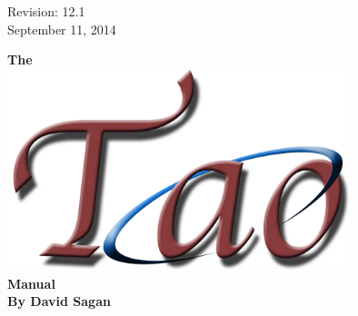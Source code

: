 \thispagestyle{empty}

\begin{flushright}
\large
Revision: 12.1 \\
September 11, 2014 \\
\end{flushright}

\vfill


{
\begin{center}
{\Huge \sf\bf The} \\
\vskip 0.1in
\includegraphics[width=10cm]{tao-logo.pdf} \\
\vskip 0.1in
{\Huge \sf\bf Manual} \\
\vskip 0.4in
{\Large \sf\bf By David Sagan} \\
\end{center}
}

\vfill
\break
